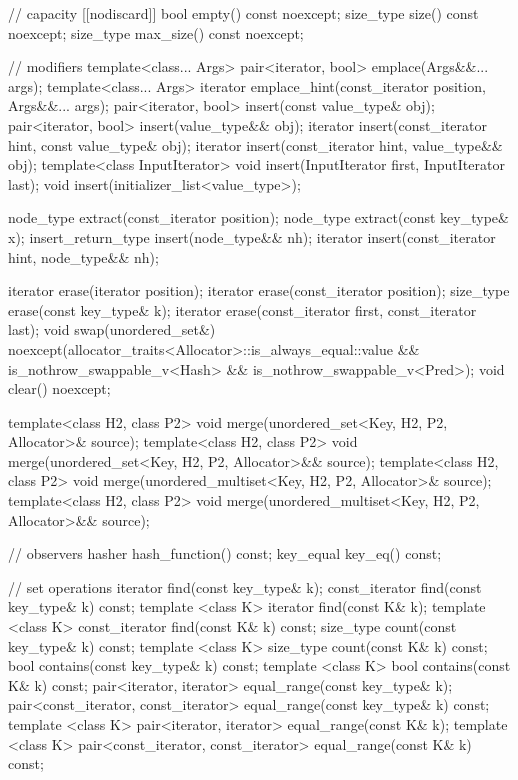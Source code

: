 \begin{codeblock}
{{    // capacity
    [[nodiscard]] bool empty() const noexcept;
    size_type size() const noexcept;
    size_type max_size() const noexcept;

    // modifiers
    template<class... Args> pair<iterator, bool> emplace(Args&&... args);
    template<class... Args> iterator emplace_hint(const_iterator position, Args&&... args);
    pair<iterator, bool> insert(const value_type& obj);
    pair<iterator, bool> insert(value_type&& obj);
    iterator insert(const_iterator hint, const value_type& obj);
    iterator insert(const_iterator hint, value_type&& obj);
    template<class InputIterator> void insert(InputIterator first, InputIterator last);
    void insert(initializer_list<value_type>);

    node_type extract(const_iterator position);
    node_type extract(const key_type& x);
    insert_return_type insert(node_type&& nh);
    iterator           insert(const_iterator hint, node_type&& nh);

    iterator  erase(iterator position);
    iterator  erase(const_iterator position);
    size_type erase(const key_type& k);
    iterator  erase(const_iterator first, const_iterator last);
    void      swap(unordered_set&)
      noexcept(allocator_traits<Allocator>::is_always_equal::value &&
               is_nothrow_swappable_v<Hash> &&
               is_nothrow_swappable_v<Pred>);
    void      clear() noexcept;

    template<class H2, class P2>
      void merge(unordered_set<Key, H2, P2, Allocator>& source);
    template<class H2, class P2>
      void merge(unordered_set<Key, H2, P2, Allocator>&& source);
    template<class H2, class P2>
      void merge(unordered_multiset<Key, H2, P2, Allocator>& source);
    template<class H2, class P2>
      void merge(unordered_multiset<Key, H2, P2, Allocator>&& source);

    // observers
    hasher hash_function() const;
    key_equal key_eq() const;

    // set operations
    iterator         find(const key_type& k);
    const_iterator   find(const key_type& k) const;
    template <class K>
      iterator       find(const K& k);
    template <class K>
      const_iterator find(const K& k) const;
    size_type        count(const key_type& k) const;
    template <class K>
      size_type      count(const K& k) const;
    bool             contains(const key_type& k) const;
    template <class K>
      bool           contains(const K& k) const;
    pair<iterator, iterator>               equal_range(const key_type& k);
    pair<const_iterator, const_iterator>   equal_range(const key_type& k) const;
    template <class K>
      pair<iterator, iterator>             equal_range(const K& k);
    template <class K>
      pair<const_iterator, const_iterator> equal_range(const K& k) const;

}}
\end{codeblock}
